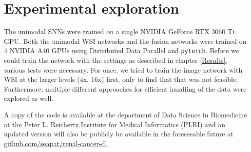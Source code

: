 \section{Experimental exploration}


The unimodal SNNs were trained on a single NVIDIA GeForce RTX 3060 Ti GPU. Both the unimodal WSI networks and the fusion networks were trained on 4 NVIDIA A40 GPUs using Distributed Data Parallel and \verb|pytorch|. Before we could train the network with the settings as described in chapter \ref{Results}, various tests were necessary. For once, we tried to train the image network with WSI at the larger levels (4x, 16x) first, only to find that that was not feasible. Furthermore, multiple different approaches for efficient handling of the data were explored as well. 

A copy of the code is available at the department of Data Science in Biomedicine at the Peter L. Reichertz Institute for Medical Informatics (PLRI) and an updated version will also be publicly be available in the foreseeable future at \url{github.com/seapat/renal-cancer-dl}.





